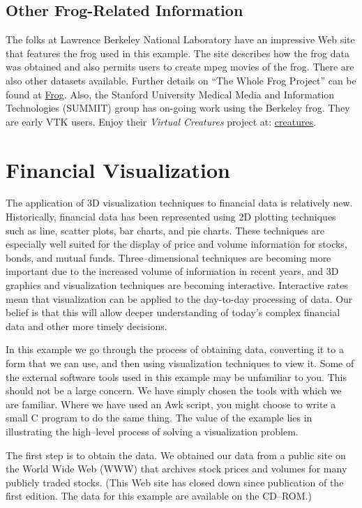 \subsection{Other Frog-Related Information}

The folks at Lawrence Berkeley National Laboratory have an impressive Web site that features the frog used in this example. The site describes how the frog data was obtained and also permits users to create mpeg movies of the frog. There are also other datasets available. Further details on ``The Whole Frog Project'' can be found at \href{http://www-itg.lbl.gov/Frog}{Frog}. Also, the Stanford University Medical Media and Information Technologies (SUMMIT) group has on-going work using the Berkeley frog. They are early VTK users. Enjoy their \emph{Virtual Creatures} project at: \href{http://summit.stanford.edu/creatures}{creatures}.

\section{Financial Visualization}

The application of 3D visualization techniques to financial data is relatively new. Historically, financial data has been represented using 2D plotting techniques such as line, scatter plots, bar charts, and pie charts. These techniques are especially well suited for the display of price and volume information for stocks, bonds, and mutual funds. Three--dimensional techniques are becoming more important due to the increased volume of information in recent years, and 3D graphics and visualization techniques are becoming interactive. Interactive rates mean that visualization can be applied to the day-to-day processing of data. Our belief is that this will allow deeper understanding of today's complex financial data and other more timely decisions.

In this example we go through the process of obtaining data, converting it to a form that we can use, and then using visualization techniques to view it. Some of the external software tools used in this example may be unfamiliar to you. This should not be a large concern. We have simply chosen the tools with which we are familiar. Where we have used an Awk script, you might choose to write a small C program to do the same thing. The value of the example lies in illustrating the high--level process of solving a visualization problem.

The first step is to obtain the data. We obtained our data from a public site on the World Wide Web (WWW) that archives stock prices and volumes for many publicly traded stocks. (This Web site has closed down since publication of the first edition. The data for this example are available on the CD--ROM.)

